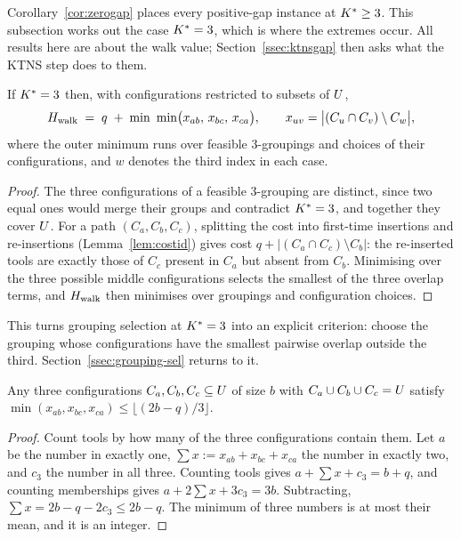 Corollary~\ref{cor:zerogap} places every positive-gap instance at $K^{\ast}\ge3$. This
subsection works out the case $\Kst=3$, which is where the extremes occur. All
results here are about the walk value; Section~\ref{ssec:ktnsgap} then asks what the
KTNS step does to them.

\begin{proposition}[Exact walk cost at $\Kst=3$]\label{prop:hk3}
If $\Kst=3$ then, with configurations restricted to subsets of $U$,
\[
  \Hwalk\;=\;q\;+\;\min\ \min\bigl(x_{ab},\,x_{bc},\,x_{ca}\bigr),
  \qquad x_{uv}=\bigl\lvert(C_u\cap C_v)\setminus C_w\bigr\rvert,
\]
where the outer minimum runs over feasible $3$-groupings and choices of their
configurations, and $w$ denotes the third index in each case.
\end{proposition}

\begin{proof}
The three configurations of a feasible $3$-grouping are distinct, since two equal
ones would merge their groups and contradict $\Kst=3$, and together they cover $U$.
For a path $(C_a,C_b,C_c)$, splitting the cost into first-time insertions and
re-insertions (Lemma~\ref{lem:costid}) gives cost
$q+\lvert(C_a\cap C_c)\setminus C_b\rvert$: the re-inserted tools are exactly those
of $C_c$ present in $C_a$ but absent from $C_b$. Minimising over the three possible
middle configurations selects the smallest of the three overlap terms, and $H_{\mathrm{walk}}$
then minimises over groupings and configuration choices.
\end{proof}

This turns grouping selection at $\Kst=3$ into an explicit criterion: choose the
grouping whose configurations have the smallest pairwise overlap outside the third.
Section~\ref{ssec:grouping-sel} returns to it.

\begin{lemma}\label{lem:overlap}
Any three configurations $C_a,C_b,C_c\subseteq U$ of size $b$ with
$C_a\cup C_b\cup C_c=U$ satisfy
$\min(x_{ab},x_{bc},x_{ca})\le\lfloor(2b-q)/3\rfloor$.
\end{lemma}

\begin{proof}
Count tools by how many of the three configurations contain them. Let $a$ be the
number in exactly one, $\sum x:=x_{ab}+x_{bc}+x_{ca}$ the number in exactly two, and
$c_3$ the number in all three. Counting tools gives $a+\sum x+c_3=b+q$, and counting
memberships gives $a+2\sum x+3c_3=3b$. Subtracting, $\sum x=2b-q-2c_3\le2b-q$. The
minimum of three numbers is at most their mean, and it is an integer.
\end{proof}

